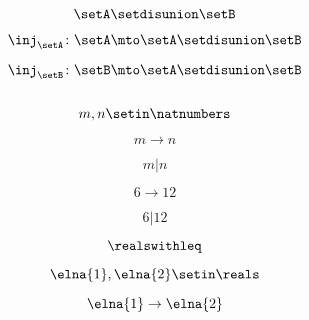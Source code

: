 \begin{forslides}
    \begin{equation}
        \label{eq:systems-121}
        \setA \setdisunion \setB
    \end{equation}

    \begin{equation}
        \label{eq:systems-122}
        \inj_\setA\colon \setA\mto \setA \setdisunion\setB
    \end{equation}

    \begin{equation}
        \label{eq:systems-123}
        \inj_\setB\colon \setB\mto \setA \setdisunion\setB
    \end{equation}

    \begin{equation}
        \label{eq:systems-124}
    \end{equation}

    \begin{equation}
        \label{eq:systems-125}
        m,n\setin \natnumbers
    \end{equation}

    \begin{equation}
        \label{eq:systems-126}
        m\to n
    \end{equation}

    \begin{equation}
        \label{eq:systems-127}
        m | n
    \end{equation}

    \begin{equation}
        \label{eq:systems-128}
        6\to 12
    \end{equation}

    \begin{equation}
        \label{eq:systems-129}
        6 | 12
    \end{equation}

    \begin{equation}
        \label{eq:systems-130}
        \realswithleq
    \end{equation}

    \begin{equation}
        \label{eq:systems-131}
        \elna{1},\elna{2}\setin \reals
    \end{equation}

    \begin{equation}
        \label{eq:systems-132}
        \elna{1}\to \elna{2}
    \end{equation}


\end{forslides}
